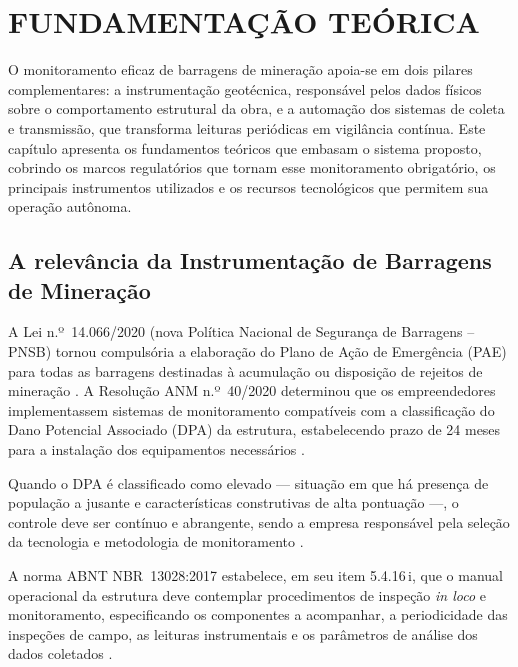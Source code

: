 \chapter{FUNDAMENTAÇÃO TEÓRICA}
\label{cap2Fundamentacao}

O monitoramento eficaz de barragens de mineração apoia-se em dois pilares
complementares: a instrumentação geotécnica, responsável pelos dados físicos
sobre o comportamento estrutural da obra, e a automação dos sistemas de coleta
e transmissão, que transforma leituras periódicas em vigilância contínua.
Este capítulo apresenta os fundamentos teóricos que embasam o sistema proposto,
cobrindo os marcos regulatórios que tornam esse monitoramento
obrigatório, os principais instrumentos utilizados e os recursos tecnológicos
que permitem sua operação autônoma.

\section{A relevância da Instrumentação de Barragens de Mineração}
\label{sec:relevancia_instrumentacao}

A Lei n.º~14.066/2020 (nova Política Nacional de Segurança de Barragens --
PNSB) tornou compulsória a elaboração do Plano de Ação de Emergência (PAE)
para todas as barragens destinadas à acumulação ou disposição de rejeitos de
mineração \cite{brasil2020lei14066}. A Resolução ANM n.º~40/2020 determinou
que os empreendedores implementassem sistemas de monitoramento compatíveis
com a classificação do Dano Potencial Associado (DPA) da estrutura,
estabelecendo prazo de 24 meses para a instalação dos equipamentos
necessários \cite{anm2021resolucao56}.
 
Quando o DPA é classificado como elevado --- situação em que há presença de
população a jusante e características construtivas de alta pontuação ---, o
controle deve ser contínuo e abrangente, sendo a empresa responsável pela
seleção da tecnologia e metodologia de monitoramento \cite{silva2019sistema}.
 
A norma ABNT NBR~13028:2017 estabelece, em seu item 5.4.16\,i, que o manual
operacional da estrutura deve contemplar procedimentos de inspeção
\textit{in loco} e monitoramento, especificando os componentes a acompanhar,
a periodicidade das inspeções de campo, as leituras instrumentais e os
parâmetros de análise dos dados coletados \cite{abnt2017}.
 
